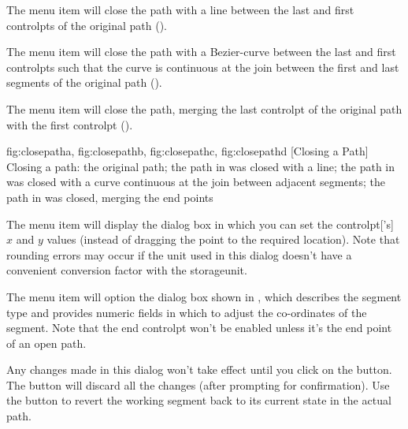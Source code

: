 The  menu item will
close the path with a line between the last and first
\glspl*{controlpt} of the original path ().


The  menu item will
close the path with a \gls{Bezier-curve} between the last and first
\glspl*{controlpt} such that the curve is continuous at the join
between the first and last segments of the original path
().


The  menu item will
close the path, merging the last \gls*{controlpt} of the original
path with the first \gls*{controlpt} ().

{%
  {fig:closepatha}{}{},
  {fig:closepathb}{}{},
  {fig:closepathc}{}{},
  {fig:closepathd}{}{}
}
[Closing a Path]
{Closing a path:  the original path;
the path in  was closed with a line;
 the path in  was closed with a
curve continuous at the join between adjacent segments;
 the path in  was closed, merging
the end points}


The  menu item will display the
 dialog box in which you can set the
\gls{controlpt}['s] $x$ and $y$ values (instead of dragging the
point to the required location).  Note that rounding errors may
occur if the unit used in this dialog doesn't have a convenient
conversion factor with the \gls{storageunit}.


The  menu item will option the 
 dialog box shown in
, which describes the segment type and
provides numeric fields in which to adjust the co-ordinates of the
segment. Note that the end \gls{controlpt} won't be enabled unless 
it's the end point of an open path.

Any changes made in this dialog won't take effect until you click on
the  button. The  button will discard all the
changes (after prompting for confirmation). Use the 
 button to revert the working segment
back to its current state in the actual path.

